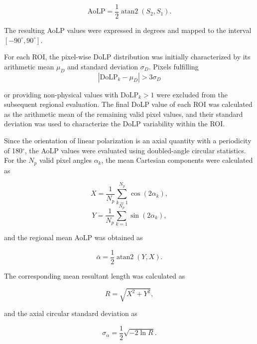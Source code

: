 \documentclass[pdflatex,sn-apa]{sn-jnl}
\begin{document}
\begin{equation}
 \mathrm{AoLP}=\frac{1}{2}\operatorname{atan2}(S_2,S_1).
 \label{eq:aolp}
\end{equation}

The resulting AoLP values were expressed in degrees and mapped to the interval $[-90^{\circ},90^{\circ}]$.

For each ROI, the pixel-wise DoLP distribution was initially characterized by its arithmetic mean $\mu_D$ and standard deviation $\sigma_D$. Pixels fulfilling
\begin{equation}
 \left|\mathrm{DoLP}_k-\mu_D\right|>3\sigma_D
\end{equation}

or providing non-physical values with $\mathrm{DoLP}_k>1$ were excluded from the subsequent regional evaluation. The final DoLP value of each ROI was calculated as the arithmetic mean of the remaining valid pixel values, and their standard deviation was used to characterize the DoLP variability within the ROI.

Since the orientation of linear polarization is an axial quantity with a periodicity of 180$^{\circ}$, the AoLP values were evaluated using doubled-angle circular statistics. For the $N_p$ valid pixel angles $\alpha_k$, the mean Cartesian components were calculated as

\begin{equation}\label{eq:circular_xy}
 X = \frac{1}{N_p}\sum_{k=1}^{N_p}\cos(2\alpha_k), 
\end{equation}
\begin{equation}
 Y = \frac{1}{N_p}\sum_{k=1}^{N_p}\sin(2\alpha_k),
\end{equation}

\noindent
and the regional mean AoLP was obtained as

\begin{equation}
 \bar{\alpha}=\frac{1}{2}\operatorname{atan2}(Y,X).
 \label{eq:circular_mean}
\end{equation}

\noindent
The corresponding mean resultant length was calculated as

\begin{equation}
 R=\sqrt{X^2+Y^2},
 \label{eq:resultant_length}
\end{equation}

\noindent
and the axial circular standard deviation as

\begin{equation}
 \sigma_{\alpha}=\frac{1}{2}\sqrt{-2\ln R}.
 \label{eq:circular_std}
\end{equation}
\end{document}
